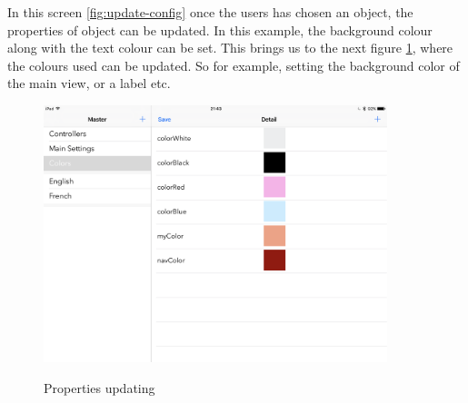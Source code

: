 In this screen \ref{fig:update-config} once the users has chosen an object, the properties of object can be updated. In this example, the background colour along with the text colour can be set. This brings us to the next figure \ref{fig:config-color}, where the colours used can be updated. So for example, setting the background color of the main view, or a label etc.

\begin{figure}[!h]
    \caption{Properties updating}
    \centering
    \includegraphics[width=100mm]{images/ipad-images/color}
    \label{fig:config-color}
\end{figure}